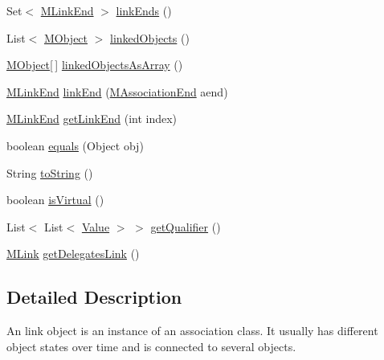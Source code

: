 \begin{DoxyCompactItemize}
\item 
Set$<$ \hyperlink{classorg_1_1tzi_1_1use_1_1uml_1_1sys_1_1_m_link_end}{M\-Link\-End} $>$ \hyperlink{classorg_1_1tzi_1_1use_1_1uml_1_1sys_1_1_m_link_object_impl_a08613185a9fb06613197f10b015d41e4}{link\-Ends} ()
\item 
List$<$ \hyperlink{interfaceorg_1_1tzi_1_1use_1_1uml_1_1sys_1_1_m_object}{M\-Object} $>$ \hyperlink{classorg_1_1tzi_1_1use_1_1uml_1_1sys_1_1_m_link_object_impl_ae85fbbf9f09ed1e086c469e5eb011a68}{linked\-Objects} ()
\item 
\hyperlink{interfaceorg_1_1tzi_1_1use_1_1uml_1_1sys_1_1_m_object}{M\-Object}\mbox{[}$\,$\mbox{]} \hyperlink{classorg_1_1tzi_1_1use_1_1uml_1_1sys_1_1_m_link_object_impl_af0f390d575856c036fa4940e819b190b}{linked\-Objects\-As\-Array} ()
\item 
\hyperlink{classorg_1_1tzi_1_1use_1_1uml_1_1sys_1_1_m_link_end}{M\-Link\-End} \hyperlink{classorg_1_1tzi_1_1use_1_1uml_1_1sys_1_1_m_link_object_impl_a9ec9de476da558ecd4a507af07644c27}{link\-End} (\hyperlink{classorg_1_1tzi_1_1use_1_1uml_1_1mm_1_1_m_association_end}{M\-Association\-End} aend)
\item 
\hyperlink{classorg_1_1tzi_1_1use_1_1uml_1_1sys_1_1_m_link_end}{M\-Link\-End} \hyperlink{classorg_1_1tzi_1_1use_1_1uml_1_1sys_1_1_m_link_object_impl_a48c1bfd6f7ccfbce45b5fd79fe863c63}{get\-Link\-End} (int index)
\item 
boolean \hyperlink{classorg_1_1tzi_1_1use_1_1uml_1_1sys_1_1_m_link_object_impl_a863b159843b3cd2561c458276ae95c5c}{equals} (Object obj)
\item 
String \hyperlink{classorg_1_1tzi_1_1use_1_1uml_1_1sys_1_1_m_link_object_impl_ae192b9c7ab397f1cd3b49098f322d472}{to\-String} ()
\item 
boolean \hyperlink{classorg_1_1tzi_1_1use_1_1uml_1_1sys_1_1_m_link_object_impl_a5612c41f2f048087a5c5d0e1a363e030}{is\-Virtual} ()
\item 
List$<$ List$<$ \hyperlink{classorg_1_1tzi_1_1use_1_1uml_1_1ocl_1_1value_1_1_value}{Value} $>$ $>$ \hyperlink{classorg_1_1tzi_1_1use_1_1uml_1_1sys_1_1_m_link_object_impl_a3438cca293084b2e9ab916d6e2be5d49}{get\-Qualifier} ()
\item 
\hyperlink{interfaceorg_1_1tzi_1_1use_1_1uml_1_1sys_1_1_m_link}{M\-Link} \hyperlink{classorg_1_1tzi_1_1use_1_1uml_1_1sys_1_1_m_link_object_impl_a7282c6f41a7601e1b0ade55f299896d3}{get\-Delegates\-Link} ()
\end{DoxyCompactItemize}


\subsection{Detailed Description}
An link object is an instance of an association class. It usually has different object states over time and is connected to several objects.


